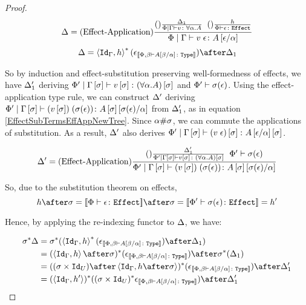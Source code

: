 \documentclass{Report}
\begin{document}
\begin{proof}
\begin{equation}\label{EffectSubTermsEffAppTree}
    \Delta = (\text{Effect-Application}) \frac{(\text{}) \frac{\Delta_1}{\Phi\mid\Gamma \vdash v \colon \forall \alpha. A}\;\;(\text{}) \frac{h}{\Phi \vdash \epsilon \colon \texttt{Effect}}}{\Phi\mid\Gamma \vdash v\;\epsilon \colon A\left[\epsilon / \alpha\right]}
\end{equation}
\begin{equation}\label{EffectSubTermsEffAppDeno}
    \D = \pr{\Id{\G}}{h}\star(\e_{\deno{\typerelation{\P,\b}{A\ssub{\a}{\b}}{\type}}})\after\D_1
\end{equation}

So by induction and effect-substitution preserving well-formedness of effects, we have $\Delta_1'$ deriving $\Phi'\mid\Gamma\left[\sigma\right] \vdash v\left[\sigma\right] \colon (\forall \alpha. A)\left[\sigma\right]$ and $\Phi'\vdash \sigma(\epsilon)$. Using the effect-application type rule, we can construct $\Delta'$ deriving $\Phi'\mid\Gamma\left[\sigma\right] \vdash (v\left[\sigma\right])\;(\sigma(\epsilon)) \colon A\left[\sigma\right]\left[\sigma(\epsilon) / \alpha\right]$ from $\Delta_1'$, as in equation \ref{EffectSubTermsEffAppNewTree}. Since $\alpha\#\sigma$, we can commute the applications of substitution. As a result, $\Delta'$ also derives $\Phi'\mid\Gamma\left[\sigma\right] \vdash (v\;\epsilon)\left[\sigma\right] \colon A\left[\epsilon / \alpha\right]\left[\sigma\right]$.


\begin{equation}
    \label{EffectSubTermsEffAppNewTree}
    \Delta' = (\text{Effect-Application}) \frac{
    (\text{}) \frac{\Delta_1'}{\Phi'\mid\Gamma\left[\sigma\right] \vdash v\left[\sigma\right] \colon (\forall \alpha. A)\left[\sigma\right]}
    \;\;
    \Phi'\vdash \sigma(\epsilon)
    }{\Phi'\mid\Gamma\left[\sigma\right] \vdash (v\left[\sigma\right])\;(\sigma(\epsilon)) \colon A\left[\sigma\right]\left[\sigma(\epsilon) / \alpha\right]}
\end{equation}



So, due to the substitution theorem on effects,
\begin{equation}
    h\after\si = \deno{\typerelation{\P}{\e}{\effect}}\after\si = \deno{\typerelation{\P'}{\si(\e)}{\effect}} = h'
\end{equation}

Hence, by applying the re-indexing functor to $\Delta$, we have:

\begin{align}
    \si\star{\D} & = \si\star(\pr{\Id{\G}}{h}\star(\e_{\deno{\typerelation{\P,\b}{A\ssub{\a}{\b}}{\type}}})\after\D_1)\\
    & = (\pr{\Id{\G}}{h}\after\si)\star(\e_{\deno{\typerelation{\P,\b}{A\ssub{\a}{\b}}{\type}}})\after\si\star(\D_1)\\
    & = ((\si\times\Id{U})\after\pr{\Id{\G}}{h\after\si})\star(\e_{\deno{\typerelation{\P,\b}{A\ssub{\a}{\b}}{\type}}})\after\D_1'\\
    & = (\pr{\Id{\G}}{h'})\star((\si\times\Id{U})\star\e_{\deno{\typerelation{\P,\b}{A\ssub{\a}{\b}}{\type}}})\after\D_1'
\end{align}


\end{proof}
\end{document}

